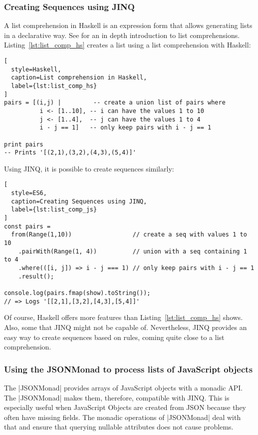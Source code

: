 \subsubsection{Creating Sequences using JINQ} %
\label{sec:Creating Sequences using JINQ}
A list comprehension in Haskell is an expression form that allows generating
lists in a declarative way. See \cite[Chapter 5]{hutton_pih_2016} for an
in depth introduction to list comprehensions. \\
Listing~\ref{lst:list_comp_hs} creates a list using a list comprehension with
Haskell:

\begin{lstlisting}[
  style=Haskell,
  caption=List comprehension in Haskell,
  label={lst:list_comp_hs}
]
pairs = [(i,j) |         -- create a union list of pairs where
          i <- [1..10], -- i can have the values 1 to 10
          j <- [1..4],  -- j can have the values 1 to 4
          i - j == 1]   -- only keep pairs with i - j == 1

print pairs
-- Prints '[(2,1),(3,2),(4,3),(5,4)]'
\end{lstlisting}

Using JINQ, it is possible to create sequences similarly:
\begin{lstlisting}[
  style=ES6,
  caption=Creating Sequences using JINQ,
  label={lst:list_comp_js}
]
const pairs =
  from(Range(1,10))                 // create a seq with values 1 to 10
    .pairWith(Range(1, 4))          // union with a seq containing 1 to 4
    .where(([i, j]) => i - j === 1) // only keep pairs with i - j == 1
    .result();

console.log(pairs.fmap(show).toString());
// => Logs '[[2,1],[3,2],[4,3],[5,4]]'
\end{lstlisting}

Of course, Haskell offers more features than Listing~\ref{lst:list_comp_hs}
shows. Also, some that JINQ might not be capable of. Nevertheless, JINQ
provides an easy way to create sequences based on rules, coming quite close to
a list comprehension.

\subsubsection{Using the JSONMonad to process lists of JavaScript objects} %
\label{subsub:Using the JSONMonad to process lists of JavaScript objects}
The |JSONMonad| provides arrays of JavaScript objects with a monadic API. The
|JSONMonad| makes them, therefore, compatible with JINQ. This is especially
useful when JavaScript Objects are created from JSON because they often have
missing fields. The monadic operations of |JSONMonad| deal with that and ensure
that querying nullable attributes does not cause problems.

